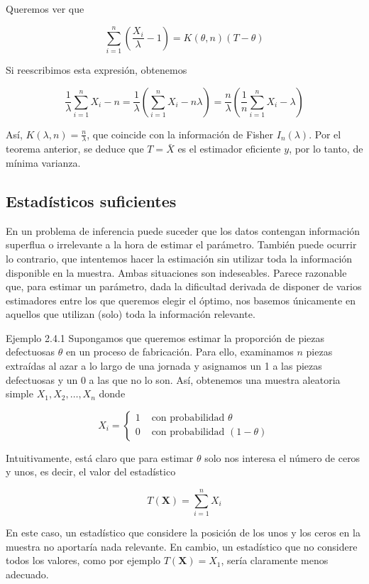\documentclass[
]{article}
\begin{document}
Queremos ver que

\[
\sum_{i=1}^{n}\left(\frac{X_{i}}{\lambda}-1\right)=K(\theta, n)(T-\theta)
\]

Si reescribimos esta expresión, obtenemos

\[
\frac{1}{\lambda} \sum_{i=1}^{n} X_{i}-n=\frac{1}{\lambda}\left(\sum_{i=1}^{n} X_{i}-n \lambda\right)=\frac{n}{\lambda}\left(\frac{1}{n} \sum_{i=1}^{n} X_{i}-\lambda\right)
\]

Así, \(K(\lambda, n)=\frac{n}{\lambda}\), que coincide con la información de Fisher \(I_{n}(\lambda)\). Por el teorema anterior, se deduce que \(T=\bar{X}\) es el estimador eficiente \(y\), por lo tanto, de mínima varianza.

\subsection{Estadísticos suficientes}\label{estaduxedsticos-suficientes}

En un problema de inferencia puede suceder que los datos contengan información superflua o irrelevante a la hora de estimar el parámetro. También puede ocurrir lo contrario, que intentemos hacer la estimación sin utilizar toda la información disponible en la muestra. Ambas situaciones son indeseables. Parece razonable que, para estimar un parámetro, dada la dificultad derivada de disponer de varios estimadores entre los que queremos elegir el óptimo, nos basemos únicamente en aquellos que utilizan (solo) toda la información relevante.

Ejemplo 2.4.1 Supongamos que queremos estimar la proporción de piezas defectuosas \(\theta\) en un proceso de fabricación. Para ello, examinamos \(n\) piezas extraídas al azar a lo largo de una jornada y asignamos un 1 a las piezas defectuosas y un 0 a las que no lo son. Así, obtenemos una muestra aleatoria simple \(X_{1}, X_{2}, \ldots, X_{n}\) donde

\[
X_{i}= \begin{cases}1 & \text { con probabilidad } \theta \\ 0 & \text { con probabilidad }(1-\theta)\end{cases}
\]

Intuitivamente, está claro que para estimar \(\theta\) solo nos interesa el número de ceros y unos, es decir, el valor del estadístico

\[
T(\mathbf{X})=\sum_{i=1}^{n} X_{i}
\]

En este caso, un estadístico que considere la posición de los unos y los ceros en la muestra no aportaría nada relevante. En cambio, un estadístico que no considere todos los valores, como por ejemplo \(T(\mathbf{X})=X_{1}\), sería claramente menos adecuado.
\end{document}

